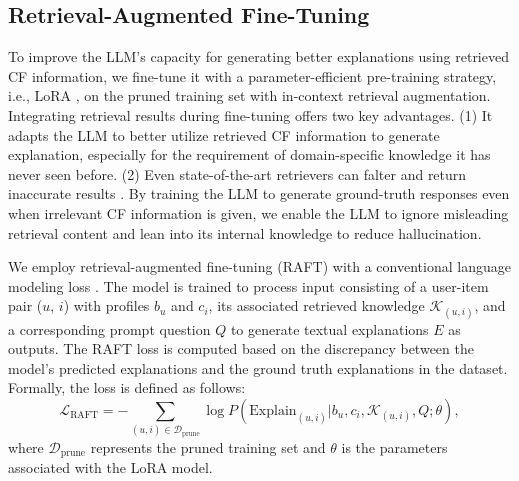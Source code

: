 \subsection{Retrieval-Augmented Fine-Tuning}

 To improve the LLM's capacity for generating better explanations using retrieved CF information, we fine-tune it with a parameter-efficient pre-training strategy, i.e., LoRA \cite{hu2021lora}, on the pruned training set with in-context retrieval augmentation. Integrating retrieval results during fine-tuning offers two key advantages. (1) It adapts the LLM to better utilize retrieved CF information to generate explanation, especially for the requirement of domain-specific knowledge it has never seen before. (2) Even state-of-the-art retrievers can falter and return inaccurate results \cite{linra}. By training the LLM to generate ground-truth responses even when irrelevant CF information is given, we enable the LLM to ignore misleading retrieval content and lean into its internal knowledge to reduce hallucination. 

 We employ retrieval-augmented fine-tuning (RAFT) with a conventional language modeling loss \cite{zhang2024raft}. The model is trained to process input consisting of a user-item pair ($u$, $i$) with profiles $b_u$ and $c_i$, its associated retrieved knowledge $\mathcal{K}_{(u,i)}$, and a corresponding prompt question $Q$ to generate textual explanations $E$ as outputs. The RAFT loss is computed based on the discrepancy between the model's predicted explanations and the ground truth explanations in the dataset. Formally, the loss is defined as follows:
\begin{equation}
    \mathcal{L}_{\text{RAFT}} = -\sum_{(u, i)\in \mathcal{D}_{\text{prune}}} \log P(\text{Explain}_{(u, i)} | b_u, c_i, \mathcal{K}_{(u,i)}, Q; \theta),
\end{equation}
where $\mathcal{D}_{\text{prune}}$ represents the pruned training set and $\theta$ is the parameters associated with the LoRA model.
